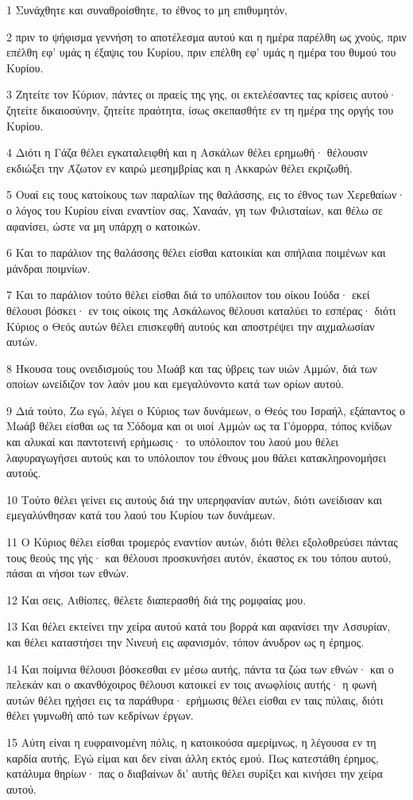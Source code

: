 \par 1 Συνάχθητε και συναθροίσθητε, το έθνος το μη επιθυμητόν,
\par 2 πριν το ψήφισμα γεννήση το αποτέλεσμα αυτού και η ημέρα παρέλθη ως χνούς, πριν επέλθη εφ' υμάς η έξαψις του Κυρίου, πριν επέλθη εφ' υμάς η ημέρα του θυμού του Κυρίου.
\par 3 Ζητείτε τον Κύριον, πάντες οι πραείς της γης, οι εκτελέσαντες τας κρίσεις αυτού· ζητείτε δικαιοσύνην, ζητείτε πραότητα, ίσως σκεπασθήτε εν τη ημέρα της οργής του Κυρίου.
\par 4 Διότι η Γάζα θέλει εγκαταλειφθή και η Ασκάλων θέλει ερημωθή· θέλουσιν εκδιώξει την Άζωτον εν καιρώ μεσημβρίας και η Ακκαρών θέλει εκριζωθή.
\par 5 Ουαί εις τους κατοίκους των παραλίων της θαλάσσης, εις το έθνος των Χερεθαίων· ο λόγος του Κυρίου είναι εναντίον σας, Χαναάν, γη των Φιλισταίων, και θέλω σε αφανίσει, ώστε να μη υπάρχη ο κατοικών.
\par 6 Και το παράλιον της θαλάσσης θέλει είσθαι κατοικίαι και σπήλαια ποιμένων και μάνδραι ποιμνίων.
\par 7 Και το παράλιον τούτο θέλει είσθαι διά το υπόλοιπον του οίκου Ιούδα· εκεί θέλουσι βόσκει· εν τοις οίκοις της Ασκάλωνος θέλουσι καταλύει το εσπέρας· διότι Κύριος ο Θεός αυτών θέλει επισκεφθή αυτούς και αποστρέψει την αιχμαλωσίαν αυτών.
\par 8 Ήκουσα τους ονειδισμούς του Μωάβ και τας ύβρεις των υιών Αμμών, διά των οποίων ωνείδιζον τον λαόν μου και εμεγαλύνοντο κατά των ορίων αυτού.
\par 9 Διά τούτο, Ζω εγώ, λέγει ο Κύριος των δυνάμεων, ο Θεός του Ισραήλ, εξάπαντος ο Μωάβ θέλει είσθαι ως τα Σόδομα και οι υιοί Αμμών ως τα Γόμορρα, τόπος κνίδων και αλυκαί και παντοτεινή ερήμωσις· το υπόλοιπον του λαού μου θέλει λαφυραγωγήσει αυτούς και το υπόλοιπον του έθνους μου θάλει κατακληρονομήσει αυτούς.
\par 10 Τούτο θέλει γείνει εις αυτούς διά την υπερηφανίαν αυτών, διότι ωνείδισαν και εμεγαλύνθησαν κατά του λαού του Κυρίου των δυνάμεων.
\par 11 Ο Κύριος θέλει είσθαι τρομερός εναντίον αυτών, διότι θέλει εξολοθρεύσει πάντας τους θεούς της γής· και θέλουσι προσκυνήσει αυτόν, έκαστος εκ του τόπου αυτού, πάσαι αι νήσοι των εθνών.
\par 12 Και σεις, Αιθίοπες, θέλετε διαπερασθή διά της ρομφαίας μου.
\par 13 Και θέλει εκτείνει την χείρα αυτού κατά του βορρά και αφανίσει την Ασσυρίαν, και θέλει καταστήσει την Νινευή εις αφανισμόν, τόπον άνυδρον ως η έρημος.
\par 14 Και ποίμνια θέλουσι βόσκεσθαι εν μέσω αυτής, πάντα τα ζώα των εθνών· και ο πελεκάν και ο ακανθόχοιρος θέλουσι κατοικεί εν τοις ανωφλίοις αυτής· η φωνή αυτών θέλει ηχήσει εις τα παράθυρα· ερήμωσις θέλει είσθαι εν ταις πύλαις, διότι θέλει γυμνωθή από των κεδρίνων έργων.
\par 15 Αύτη είναι η ευφραινομένη πόλις, η κατοικούσα αμερίμνως, η λέγουσα εν τη καρδία αυτής, Εγώ είμαι και δεν είναι άλλη εκτός εμού. Πως κατεστάθη έρημος, κατάλυμα θηρίων· πας ο διαβαίνων δι' αυτής θέλει συρίξει και κινήσει την χείρα αυτού.

